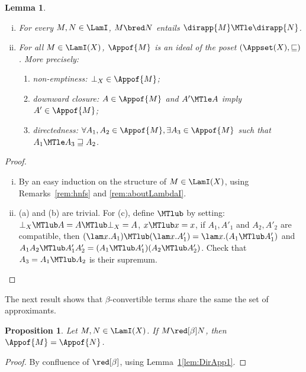 \documentclass[10pt,a4paper]{amsart}
\newtheorem{lemma}[theorem]{Lemma}
\newtheorem{proposition}[theorem]{Proposition}
\theoremstyle{definition}
\newcommand{\bsub}{\begin{enumerate}[(i)]}
\newcommand{\esub}{\end{enumerate}}
\begin{document}
\setcounter{lem:DirApp}{\thetheorem}
\begin{lemma}\label{lem:DirApp}\mbox{}
\bsub
\item\label{lem:DirApp1} 
	For every $M,N\in\LamI$, $M\bred N$ entails  $\dirapp{M} \MTle \dirapp{N}$.
\item\label{lem:DirApp2} 
	For all $M\in\LamI(X)$, $\Appof{M}$ is an ideal of the poset $(\Appset(X),\sqsubseteq)$. More precisely:
	\begin{enumerate}
	\item
		non-emptiness: $\bot_X\in \Appof{M}$;
	\item
		downward closure: $A\in \Appof{M}$ and $A'\MTle A$ imply $A'\in\Appof{M}$;
	\item
		directedness: $\forall A_1,A_2\in\Appof{M},\exists A_3\in\Appof{M}$ such that $A_1\MTle A_3 \sqsupseteq A_2$.
	\end{enumerate}
\esub
\end{lemma}
\begin{proof}
\bsub
\item
By an easy induction on the structure of $M\in\LamI(X)$, using Remarks~\ref{rem:hnfs} and \ref{rem:aboutLambdaI}.
\item (a) and (b) are trivial. 
	For (c), define $\MTlub$ by setting: 
	$\bot_X\MTlub A = A\MTlub \bot_X= A$, $x\MTlub x = x$, 
	if $A_1,A'_1$ and $A_2, A'_2$ are compatible, 
	then $(\lam x.A_1)\MTlub (\lam x.A'_1) = \lam x.(A_1\MTlub A'_1)$ 
	and $A_1A_2\MTlub A'_1A'_2 = (A_1\MTlub A'_1) (A_2\MTlub A'_2)$. 
	Check that $A_3 = A_1 \MTlub A_2$ is their supremum.
\qedhere
\esub
\end{proof}

The next result shows that $\beta$-convertible terms share the same the set of approximants.\par\addvspace{1.5ex}

\noindent\begin{minipage}{\textwidth}
\setcounter{prop:InvariantUnderBeta}{\thetheorem}
\begin{proposition}\label{prop:InvariantUnderBeta}
	Let $M,N\in\LamI(X)$. If $M\red[\beta] N$, then $\Appof{M} = \Appof{N}$.
\end{proposition}

\begin{proof}By confluence of $\red[\beta]$, using Lemma~\ref{lem:DirApp}\eqref{lem:DirApp1}.
\end{proof}
\end{minipage}
\end{document}
